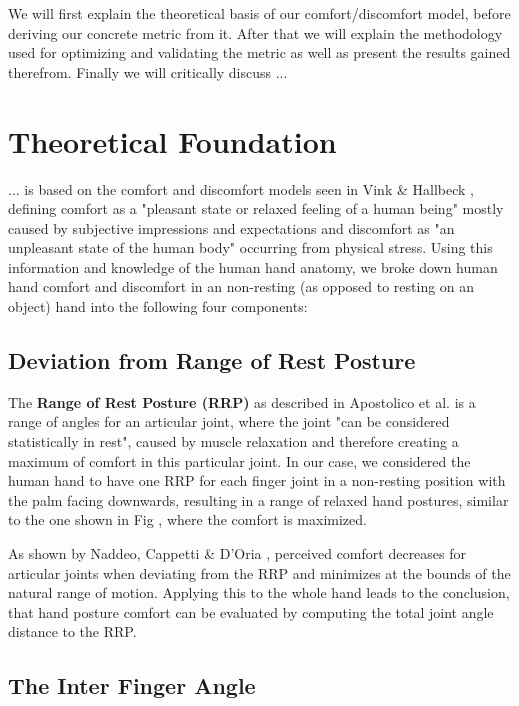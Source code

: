 \documentclass{sig-alternate-05-2015}
\begin{document}
We will first explain the theoretical basis of our comfort/discomfort model, before deriving our concrete metric from it. After that we will explain the methodology used for optimizing and validating the metric as well as present the results gained therefrom. Finally we will critically discuss ...


\section{Theoretical Foundation}
... is based on the comfort and discomfort models seen in Vink \& Hallbeck \cite{vink2012editorial}, defining comfort as a "pleasant state or relaxed feeling of a human being" mostly caused by subjective impressions and expectations and discomfort as "an unpleasant state of the human body" occurring from physical stress. Using this information and knowledge of the human hand anatomy, we broke down human hand comfort and discomfort in an non-resting (as opposed to resting on an object) hand into the following four components:

\subsection{Deviation from Range of Rest Posture}

The \textbf{Range of Rest Posture (RRP)} as described in Apostolico et al. \cite{apostolico2014postural} is a range of angles for an articular joint, where the joint "can be considered statistically in rest", caused by muscle relaxation and therefore creating a maximum of comfort in this particular joint. In our case, we considered the human hand to have one RRP for each finger joint in a non-resting position with the palm facing downwards, resulting in a range of relaxed hand postures, similar to the one shown in Fig
, where the comfort is maximized. 

As shown by Naddeo, Cappetti \& D'Oria 
\cite{naddeo2015proposal}, perceived comfort decreases for articular joints when deviating from the RRP and minimizes at the bounds of the natural range of motion. Applying this to the whole hand leads to the conclusion, that hand posture comfort can be evaluated by computing the total joint angle distance to the RRP.

\subsection{The Inter Finger Angle}
\end{document}
